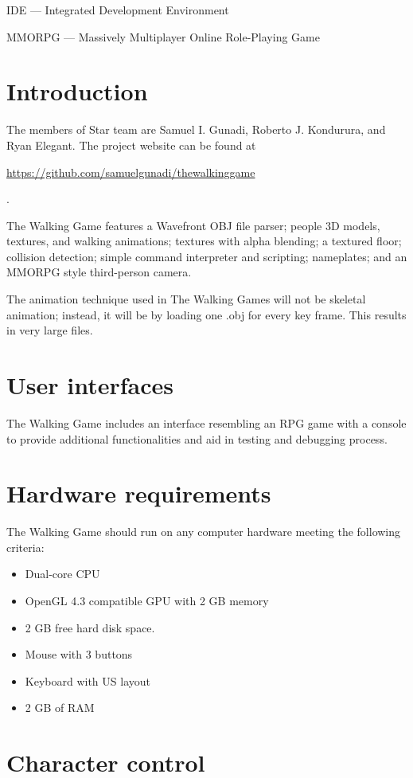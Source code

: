 \documentclass[12pt,letterpaper]{article}
\begin{document}
	\vspace{0.1in}\noindent IDE --- Integrated Development Environment
	
	\vspace{0.1in}\noindent MMORPG --- Massively Multiplayer Online Role-Playing Game
	
	\section{Introduction}
	The members of Star team are Samuel I. Gunadi, Roberto J. Kondurura, and Ryan Elegant. The project website can be found at \begin{footnotesize}\url{https://github.com/samuelgunadi/thewalkinggame}\end{footnotesize}.
	
	The Walking Game features a Wavefront OBJ file parser; people 3D models, textures, and walking animations; textures with alpha blending; a textured floor; collision detection; simple command interpreter and scripting; nameplates; and an MMORPG style third-person camera. 
	
	The animation technique used in The Walking Games will not be skeletal animation; instead, it will be by loading one .obj for every key frame. This results in very large files.
	\section{User interfaces}
	The Walking Game includes an interface resembling an RPG game with a console to provide additional functionalities and aid in testing and debugging process.
	
	\section{Hardware requirements}
	The Walking Game should run on any computer hardware meeting the following criteria:
	\begin{itemize}
	\item Dual-core CPU
	\item OpenGL 4.3 compatible GPU with 2 GB memory
	\item 2 GB free hard disk space.
	\item Mouse with 3 buttons
	\item Keyboard with US layout
	\item 2 GB of RAM
	\end{itemize}
	
	\section{Character control}
	
\end{document}
